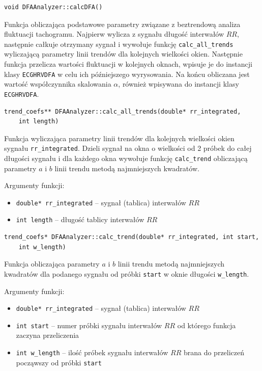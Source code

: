 \documentclass[a4paper, 11pt]{article}
\begin{document}
\begin{lstlisting}
void DFAAnalyzer::calcDFA()
\end{lstlisting}

Funkcja obliczająca podstawowe parametry związane z beztrendową analiza fluktuacji tachogramu. Najpierw wylicza z sygnału długość interwałów $RR$, następnie całkuje otrzymany sygnał i wywołuje funkcję \verb|calc_all_trends| wyliczającą parametry linii trendów dla kolejnych wielkości okien. Następnie funkcja przelicza wartości fluktuacji w kolejnych oknach, wpisuje je do instancji klasy \verb|ECGHRVDFA| w celu ich późniejszego wyrysowania. Na końcu obliczana jest wartość współczynnika skalowania $\alpha$, również wpisywana do instancji klasy \verb|ECGHRVDFA|.
\medskip{}

\begin{lstlisting}
trend_coefs** DFAAnalyzer::calc_all_trends(double* rr_integrated,
	int length)
\end{lstlisting}

Funkcja wyliczająca parametry linii trendów dla kolejnych wielkości okien sygnału \verb|rr_integrated|. Dzieli sygnał na okna o wielkości od 2 próbek do całej długości sygnału i dla każdego okna wywołuje funkcję \verb|calc_trend| obliczającą parametry $a$ i $b$ linii trendu metodą najmniejszych kwadratów.

Argumenty funkcji:
\begin{itemize}
\item \verb+double* rr_integrated+ -- sygnał (tablica) interwałów $RR$
\item \verb+int length+ -- długość tablicy interwałów $RR$
\end{itemize}
\medskip{}

\begin{lstlisting}
trend_coefs* DFAAnalyzer::calc_trend(double* rr_integrated, int start,
	int w_length)
\end{lstlisting}

Funkcja obliczająca parametry $a$ i $b$ linii trendu metodą najmniejszych kwadratów dla podanego sygnału od próbki \verb|start| w oknie długości \verb|w_length|.

Argumenty funkcji:
\begin{itemize}
\item \verb+double* rr_integrated+ -- sygnał (tablica) interwałów $RR$
\item \verb+int start+ -- numer próbki sygnału interwałów $RR$ od którego funkcja zaczyna przeliczenia
\item \verb+int w_length+ -- ilość próbek sygnału interwałów $RR$ brana do przeliczeń począwszy od próbki \verb|start|
\end{itemize}
\medskip{}
\end{document}
